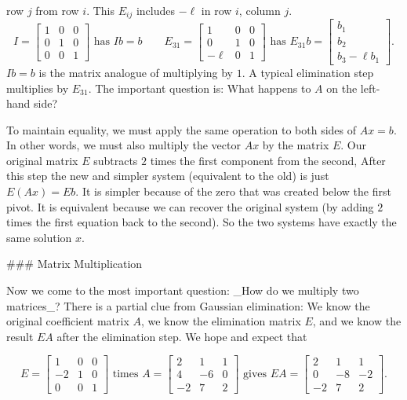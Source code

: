 row \(j\) from row \(i\). This \(E_{ij}\) includes \(-\ell\) in row \(i\), column \(j\). \[I=\begin{bmatrix}1&0&0\\ 0&1&0\\ 0&0&1\end{bmatrix}\text{ has }Ib=b\qquad E_{31}=\begin{bmatrix}1&0&0\\ 0&1&0\\ -\ell&0&1\end{bmatrix}\text{ has }E_{31}b=\begin{bmatrix}b_{1}\\ b_{2}\\ b_{3}-\ell b_{1}\end{bmatrix}.\] \(Ib=b\) is the matrix analogue of multiplying by \(1\). A typical elimination step multiplies by \(E_{31}\). The important question is: What happens to \(A\) on the left-hand side?

To maintain equality, we must apply the same operation to both sides of \(Ax=b\). In other words, we must also multiply the vector \(Ax\) by the matrix \(E\). Our original matrix \(E\) subtracts \(2\) times the first component from the second, After this step the new and simpler system (equivalent to the old) is just \(E(Ax)=Eb\). It is simpler because of the zero that was created below the first pivot. It is equivalent because we can recover the original system (by adding \(2\) times the first equation back to the second). So the two systems have exactly the same solution \(x\).

### Matrix Multiplication

Now we come to the most important question: _How do we multiply two matrices_? There is a partial clue from Gaussian elimination: We know the original coefficient matrix \(A\), we know the elimination matrix \(E\), and we know the result \(EA\) after the elimination step. We hope and expect that

\[E=\begin{bmatrix}1&0&0\\ -2&1&0\\ 0&0&1\end{bmatrix}\text{ times }A=\begin{bmatrix}2&1&1\\ 4&-6&0\\ -2&7&2\end{bmatrix}\text{ gives }EA=\begin{bmatrix}2&1&1\\ 0&-8&-2\\ -2&7&2\end{bmatrix}.\]

